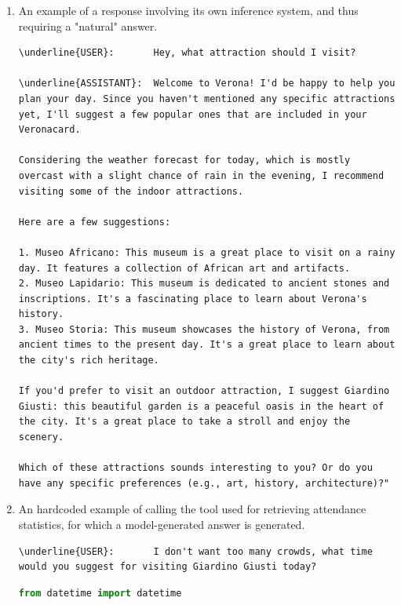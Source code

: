 \begin{enumerate}
    \item An example of a response involving its own inference system, and thus requiring a "natural" answer.

\begin{Verbatim}[breaklines=true]
\underline{USER}:       Hey, what attraction should I visit?

\underline{ASSISTANT}:  Welcome to Verona! I'd be happy to help you plan your day. Since you haven't mentioned any specific attractions yet, I'll suggest a few popular ones that are included in your Veronacard.

Considering the weather forecast for today, which is mostly overcast with a slight chance of rain in the evening, I recommend visiting some of the indoor attractions. 

Here are a few suggestions:
        
1. Museo Africano: This museum is a great place to visit on a rainy day. It features a collection of African art and artifacts.
2. Museo Lapidario: This museum is dedicated to ancient stones and inscriptions. It's a fascinating place to learn about Verona's history.
3. Museo Storia: This museum showcases the history of Verona, from ancient times to the present day. It's a great place to learn about the city's rich heritage.

If you'd prefer to visit an outdoor attraction, I suggest Giardino Giusti: this beautiful garden is a peaceful oasis in the heart of the city. It's a great place to take a stroll and enjoy the scenery.

Which of these attractions sounds interesting to you? Or do you have any specific preferences (e.g., art, history, architecture)?"
    \end{Verbatim}

    \item An hardcoded example of calling the tool used for retrieving attendance statistics, for which a model-generated answer is generated.
    
\begin{Verbatim}[breaklines=true]
\underline{USER}:       I don't want too many crowds, what time would you suggest for visiting Giardino Giusti today?
\end{Verbatim}
\begin{center}
\begin{lstlisting}[language=Python, frame=single, caption=Few-shot on \texttt{retrieve\_affluency()}.]
from datetime import datetime


\end{lstlisting}
\end{center}
\end{enumerate}
